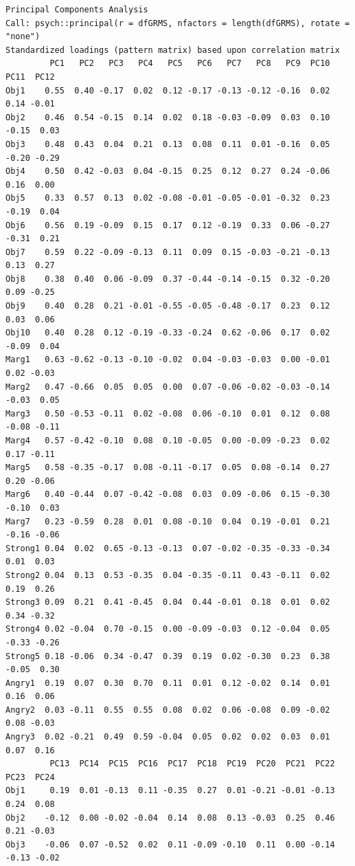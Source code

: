 \documentclass[
  english,
]{book}
\begin{document}
\begin{verbatim}
Principal Components Analysis
Call: psych::principal(r = dfGRMS, nfactors = length(dfGRMS), rotate = "none")
Standardized loadings (pattern matrix) based upon correlation matrix
         PC1   PC2   PC3   PC4   PC5   PC6   PC7   PC8   PC9  PC10  PC11  PC12
Obj1    0.55  0.40 -0.17  0.02  0.12 -0.17 -0.13 -0.12 -0.16  0.02  0.14 -0.01
Obj2    0.46  0.54 -0.15  0.14  0.02  0.18 -0.03 -0.09  0.03  0.10 -0.15  0.03
Obj3    0.48  0.43  0.04  0.21  0.13  0.08  0.11  0.01 -0.16  0.05 -0.20 -0.29
Obj4    0.50  0.42 -0.03  0.04 -0.15  0.25  0.12  0.27  0.24 -0.06  0.16  0.00
Obj5    0.33  0.57  0.13  0.02 -0.08 -0.01 -0.05 -0.01 -0.32  0.23 -0.19  0.04
Obj6    0.56  0.19 -0.09  0.15  0.17  0.12 -0.19  0.33  0.06 -0.27 -0.31  0.21
Obj7    0.59  0.22 -0.09 -0.13  0.11  0.09  0.15 -0.03 -0.21 -0.13  0.13  0.27
Obj8    0.38  0.40  0.06 -0.09  0.37 -0.44 -0.14 -0.15  0.32 -0.20  0.09 -0.25
Obj9    0.40  0.28  0.21 -0.01 -0.55 -0.05 -0.48 -0.17  0.23  0.12  0.03  0.06
Obj10   0.40  0.28  0.12 -0.19 -0.33 -0.24  0.62 -0.06  0.17  0.02 -0.09  0.04
Marg1   0.63 -0.62 -0.13 -0.10 -0.02  0.04 -0.03 -0.03  0.00 -0.01  0.02 -0.03
Marg2   0.47 -0.66  0.05  0.05  0.00  0.07 -0.06 -0.02 -0.03 -0.14 -0.03  0.05
Marg3   0.50 -0.53 -0.11  0.02 -0.08  0.06 -0.10  0.01  0.12  0.08 -0.08 -0.11
Marg4   0.57 -0.42 -0.10  0.08  0.10 -0.05  0.00 -0.09 -0.23  0.02  0.17 -0.11
Marg5   0.58 -0.35 -0.17  0.08 -0.11 -0.17  0.05  0.08 -0.14  0.27  0.20 -0.06
Marg6   0.40 -0.44  0.07 -0.42 -0.08  0.03  0.09 -0.06  0.15 -0.30 -0.10  0.03
Marg7   0.23 -0.59  0.28  0.01  0.08 -0.10  0.04  0.19 -0.01  0.21 -0.16 -0.06
Strong1 0.04  0.02  0.65 -0.13 -0.13  0.07 -0.02 -0.35 -0.33 -0.34  0.01  0.03
Strong2 0.04  0.13  0.53 -0.35  0.04 -0.35 -0.11  0.43 -0.11  0.02  0.19  0.26
Strong3 0.09  0.21  0.41 -0.45  0.04  0.44 -0.01  0.18  0.01  0.02  0.34 -0.32
Strong4 0.02 -0.04  0.70 -0.15  0.00 -0.09 -0.03  0.12 -0.04  0.05 -0.33 -0.26
Strong5 0.18 -0.06  0.34 -0.47  0.39  0.19  0.02 -0.30  0.23  0.38 -0.05  0.30
Angry1  0.19  0.07  0.30  0.70  0.11  0.01  0.12 -0.02  0.14  0.01  0.16  0.06
Angry2  0.03 -0.11  0.55  0.55  0.08  0.02  0.06 -0.08  0.09 -0.02  0.08 -0.03
Angry3  0.02 -0.21  0.49  0.59 -0.04  0.05  0.02  0.02  0.03  0.01  0.07  0.16
         PC13  PC14  PC15  PC16  PC17  PC18  PC19  PC20  PC21  PC22  PC23  PC24
Obj1     0.19  0.01 -0.13  0.11 -0.35  0.27  0.01 -0.21 -0.01 -0.13  0.24  0.08
Obj2    -0.12  0.00 -0.02 -0.04  0.14  0.08  0.13 -0.03  0.25  0.46  0.21 -0.03
Obj3    -0.06  0.07 -0.52  0.02  0.11 -0.09 -0.10  0.11  0.00 -0.14 -0.13 -0.02

\end{verbatim}
\end{document}
